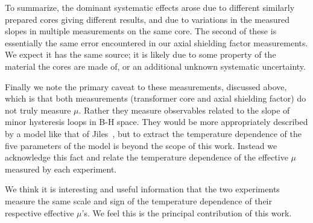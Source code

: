 

To summarize, the dominant systematic effects arose due to different
similarly prepared cores giving different results, and due to
variations in the measured slopes in multiple measurements on the same
core.  The second of these is essentially the same error encountered
in our axial shielding factor measurements.  We expect it has the same
source; it is likely due to some property of the material the cores
are made of, or an additional unknown systematic uncertainty.

Finally we note the primary caveat to these measurements, discussed
above, which is that both measurements (transformer core and axial
shielding factor) do not truly measure $\mu$.  Rather they measure
observables related to the slope of minor hysteresis loops in B-H
space.  They would be more appropriately described by a model like
that of Jiles~\cite{bib:jiles}, but to extract the temperature
dependence of the five parameters of the model is beyond the scope of
this work.  Instead we acknowledge this fact and relate the
temperature dependence of the effective $\mu$ measured by each
experiment.

We think it is interesting and useful information that the two
experiments measure the same scale and sign of the temperature
dependence of their respective effective $\mu$'s.  We feel this is the
principal contribution of this work.
